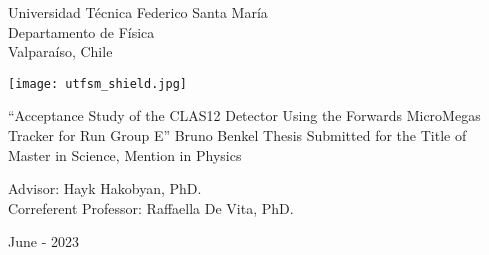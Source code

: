 \begin{titlepage}
\begin{center}
    \noindent
    \fontsize{18}{22}\selectfont Universidad T\'ecnica Federico Santa Mar\'ia \\
    \fontsize{16}{19}\selectfont Departamento de F\'isica \\
    \fontsize{16}{19}\selectfont Valpara\'iso, Chile \\
    \vspace{1.5cm}

    \texttt{[image: utfsm\_shield.jpg]}
    \vspace{1.5cm}

    \fontsize{20}{24}\selectfont ``Acceptance Study of the CLAS12 Detector Using the Forwards MicroMegas Tracker for Run Group E''
    \vfill
    \fontsize{16}{19}\selectfont Bruno Benkel
    \vfill
    \fontsize{16}{19}\selectfont Thesis Submitted for the Title of \\ Master in Science, Mention in Physics
    \vspace{1.5cm}

    \fontsize{14}{17}\selectfont Advisor: Hayk Hakobyan, PhD. \\
    \fontsize{14}{17}\selectfont Correferent Professor: Raffaella De Vita, PhD. %
    \vspace{2.5cm}

    \fontsize{14}{17}\selectfont June - 2023
\end{center}
\end{titlepage}

       \pagebreak
 \pagebreak
         \pagebreak
         \pagebreak
\tableofcontents                         \pagebreak
{} {}
\listoffigures                           \pagebreak
